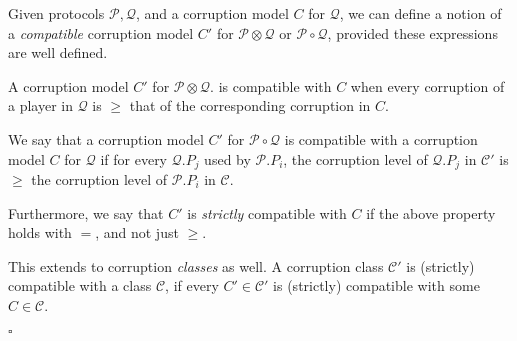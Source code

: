 \begin{definition}
  \label{def:compatc}
  Given protocols $\mathcal{P}, \mathcal{Q}$, and a corruption model
  $C$ for $\mathcal{Q}$, we can define a notion of a \emph{compatible}
  corruption model $C'$ for $\mathcal{P} \otimes \mathcal{Q}$ or $\mathcal{P} \circ \mathcal{Q}$,
  provided these expressions are well defined.

  A corruption model $C'$ for $\mathcal{P} \otimes \mathcal{Q}$.
  is compatible with $C$ when every corruption of a player
  in $\mathcal{Q}$ is $\geq$ that of the corresponding corruption in $C$.

  We say that a corruption model $C'$ for $\mathcal{P} \circ \mathcal{Q}$ is compatible with
a corruption model $C$ for $\mathcal{Q}$ if for every
$\mathcal{Q}.P_j$ used by $\mathcal{P}.P_i$, the corruption
level of $\mathcal{Q}.P_j$ in $\mathcal{C}'$ is $\geq$ the corruption level of $\mathcal{P}.P_i$
in $\mathcal{C}$.

  Furthermore, we say that $C'$ is \emph{strictly} compatible
  with $C$ if the above property holds with $=$, and not just $\geq$.

  This extends to corruption \emph{classes} as well.
  A corruption class $\mathcal{C}'$ is (strictly) compatible with a class $\mathcal{C}$,
  if every $C' \in \mathcal{C}'$ is (strictly) compatible with some $C \in \mathcal{C}$.

  $\square$
\end{definition}

